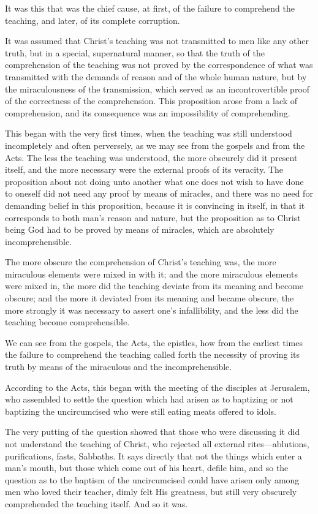 \documentclass{book}
\begin{document}
It was this that was the chief cause, at first, of the failure to comprehend the teaching, and later, of its complete corruption.

It was assumed that Christ’s teaching was not transmitted to men like any other truth, but in a special, supernatural manner, so that the truth of the comprehension of the teaching was not proved by the correspondence of what was transmitted with the demands of reason and of the whole human nature, but by the miraculousness of the transmission, which served as an incontrovertible proof of the correctness of the comprehension. This proposition arose from a lack of comprehension, and its consequence was an impossibility of comprehending.

This began with the very first times, when the teaching was still understood incompletely and often perversely, as we may see from the gospels and from the Acts. The less the teaching was understood, the more obscurely did it present itself, and the more necessary were the external proofs of its veracity. The proposition about not doing unto another what one does not wish to have done to oneself did not need any proof by means of miracles, and there was no need for demanding belief in this proposition, because it is convincing in itself, in that it corresponds to both man’s reason and nature, but the proposition as to Christ being God had to be proved by means of miracles, which are absolutely incomprehensible.

The more obscure the comprehension of Christ’s teaching was, the more miraculous elements were mixed in with it; and the more miraculous elements were mixed in, the more did the teaching deviate from its meaning and become obscure; and the more it deviated from its meaning and became obscure, the more strongly it was necessary to assert one’s infallibility, and the less did the teaching become comprehensible.

We can see from the gospels, the Acts, the epistles, how from the earliest times the failure to comprehend the teaching called forth the necessity of proving its truth by means of the miraculous and the incomprehensible.

According to the Acts, this began with the meeting of the disciples at Jerusalem, who assembled to settle the question which had arisen as to baptizing or not baptizing the uncircumcised who were still eating meats offered to idols.

The very putting of the question showed that those who were discussing it did not understand the teaching of Christ, who rejected all external rites—ablutions, purifications, fasts, Sabbaths. It says directly that not the things which enter a man’s mouth, but those which come out of his heart, defile him, and so the question as to the baptism of the uncircumcised could have arisen only among men who loved their teacher, dimly felt His greatness, but still very obscurely comprehended the teaching itself. And so it was.
\end{document}
